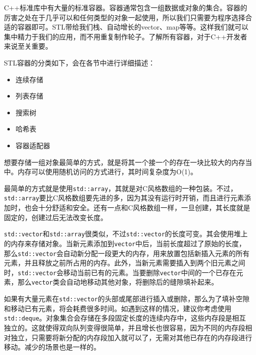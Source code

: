 C++标准库中有大量的标准容器。容器通常包含一组数据或对象的集合。容器的厉害之处在于几乎可以和任何类型的对象一起使用，所以我们只需要为程序选择合适的容器即可。STL带给我们栈、自动增长的vector、map等等。这样我们就可以集中精力于我们的应用，而不用重复制作轮子。了解所有容器，对于C++开发者来说至关重要。

STL容器的分类如下，会在各节中进行详细描述：

\begin{itemize}
\item 连续存储

\item 列表存储

\item 搜索树

\item 哈希表

\item 容器适配器

\end{itemize}


想要存储一组对象最简单的方式，就是将其一个接一个的存在一块比较大的内存当中。内存可以使用随机访问的方式进行，其时间复杂度为O(1)。

最简单的方式就是使用\texttt{std::array}，其就是对C风格数组的一种包装。不过，\texttt{std::array}要比C风格数组要先进的多，因为其没有运行时开销，而且进行元素添加时，也会十分舒适和安全。还有一点和C风格数组一样，一旦创建，其长度就是固定的，创建过后无法改变长度。

\texttt{std::vector}和\texttt{std::array}很类似，不过\texttt{std::vector}的长度可变。其会使用堆上的内存来存储对象。当新元素添加到\texttt{vector}中后，当前长度超过了原始的长度，那么\texttt{std::vector}会自动新分配一段更大的内存，用来放置包括新插入元素的所有元素，并且释放之前所占用的内存。此外，当新元素需要插入到两个旧元素之间时，\texttt{std::vector}会移动当前已有的元素。当要删除\texttt{vector}中间的一个已存在元素，那么\texttt{vector}类会自动地移动其他对象，将删除后的缝隙填补起来。

如果有大量元素在\texttt{std::vector}的头部或尾部进行插入或删除，那么为了填补空隙和移动已有元素，将会耗费很多时间。如遇到这样的情况，建议你考虑使用\texttt{std::deque}。对象集合会存储在多段固定长度的连续内存中，这些内存段是相互独立的。这就使得双向队列变得很简单，并且增长也很容易，因为不同的内存段相对独立，只需要将新分配的内存段加入就可以了，无需对其他已存在的内存段进行移动。减少的场景也是一样的。

